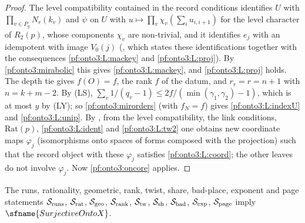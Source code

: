 \begin{proof}
The level compatibility contained in the record conditions identifies $U$ with $\prod_{v\in P_g}N_r(k_v)$ and
$\psi$ on $U$ with $u\mapsto\prod_v\chi_v(\sum_iu_{i,i+1})$ for the level character of $R_2(p)$, whose components
$\chi_v$ are non-trivial, and it identifies $e_j$ with an idempotent with image $V_0(j)$
(, which states these identifications together with the
consequences \ref{pf:onto3:L:mackey} and \ref{pf:onto3:L:proj}). By \cref{pf:onto3:mirabolic} this gives
\ref{pf:onto3:L:mackey}, and \ref{pf:onto3:L:proj} holds. The depth tie gives $f(O)=f$, the rank $f$ of the datum,
and $r_r=r=n+1$ with $n=k+m-2$. By (LS), $\sum_v1/(q_v-1)\le2f/(\min(\gamma_1,\gamma_2)-1)$, which is at most $y$ by
(LY); so \cref{pf:onto3:mirorders} (with $f_N=f$) gives \ref{pf:onto3:L:indexU} and \ref{pf:onto3:L:unip}. By
, from the level compatibility, the link conditions,
$\mathrm{Rat}(p)$, \ref{pf:onto3:L:ident} and \ref{pf:onto3:L:tw2} one obtains new coordinate maps
$\varphi_j$ (isomorphisms onto spaces of forms composed with the projection) such that the record object with
these $\varphi_j$ satisfies \ref{pf:onto3:L:coord}; the other leaves do not involve $\varphi_j$. Now
\cref{pf:onto3:oncore} applies.
\end{proof}

\begin{proposition}\label{pf:onto3:path}
The runs, rationality, geometric, rank, twist, share, bad-place, exponent and page statements
$\mathcal{S}_{\mathrm{runs}}$, $\mathcal{S}_{\mathrm{rat}}$, $\mathcal{S}_{\mathrm{geo}}$, $\mathcal{S}_{\mathrm{rank}}$, $\mathcal{S}_{\mathrm{tw}}$,
$\mathcal{S}_{\mathrm{sh}}$, $\mathcal{S}_{\mathrm{bad}}$, $\mathcal{S}_{\mathrm{exp}}$, $\mathcal{S}_{\mathrm{page}}$ imply $\sfname{SurjectiveOntoX}$.
\end{proposition}

